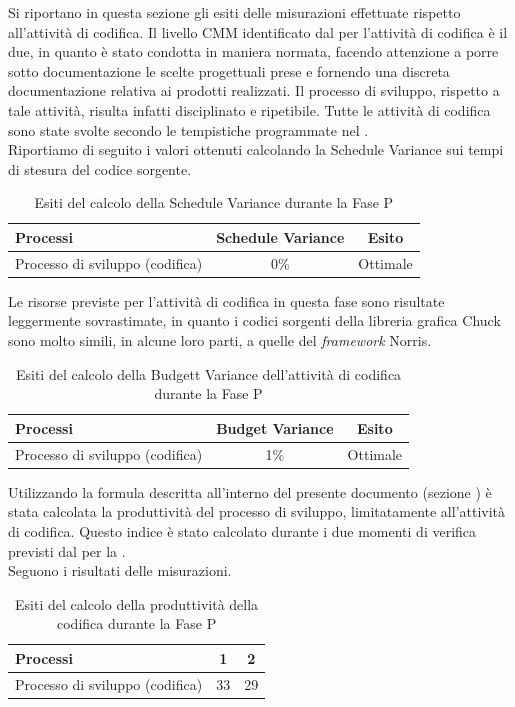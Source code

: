Si riportano in questa sezione gli esiti delle misurazioni effettuate rispetto all'attività di codifica.
Il livello CMM identificato dal \groupname{} per l'attività di codifica è il due, in quanto è stato condotta in maniera normata, facendo attenzione a porre sotto documentazione le scelte progettuali prese e fornendo una discreta documentazione relativa ai prodotti realizzati. Il processo di sviluppo, rispetto a tale attività, risulta infatti disciplinato e ripetibile.
Tutte le attività di codifica sono state svolte secondo le tempistiche programmate nel .\\

Riportiamo di seguito i valori ottenuti calcolando la Schedule Variance sui tempi di stesura del codice sorgente.
			\begin{table}[H]
				\centering
				\begin{tabu}{| l | c | c |}
					\hline
						Processi 							& Schedule Variance	& Esito		\\ \hline \hline
						Processo di sviluppo (codifica) & 0\% & Ottimale \\ \hline
				\end{tabu}
				\caption{Esiti del calcolo della Schedule Variance durante la Fase P}
			\end{table}	
			
Le risorse previste per l'attività di codifica in questa fase sono risultate leggermente sovrastimate, in quanto i codici sorgenti della libreria grafica Chuck sono molto simili, in alcune loro parti, a quelle del \textit{framework} Norris.
			\begin{table}[H]
				\centering
				\begin{tabu}{| l | c | c |}
					\hline
						Processi 							& Budget Variance	& Esito		\\ \hline \hline
						Processo di sviluppo (codifica) & 1\% & Ottimale \\ \hline
				\end{tabu}
				\caption{Esiti del calcolo della Budgett Variance dell'attività di codifica durante la Fase P}
			\end{table}	
Utilizzando la formula descritta all'interno del presente documento (sezione ) è stata calcolata la produttività del processo di sviluppo, limitatamente all'attività di codifica. Questo indice è stato calcolato durante i due momenti di verifica previsti dal  per la .\\
Seguono i risultati delle misurazioni.
\\\begin{table}[H]
				\centering
				\begin{tabu}{| l | c | c |}
					\hline
						Processi 							& 1	& 2		\\ \hline \hline
						Processo di sviluppo (codifica) & 33 & 29  \\ \hline
				\end{tabu}
				\caption{Esiti del calcolo della produttività della codifica durante la Fase P}
			\end{table}	

